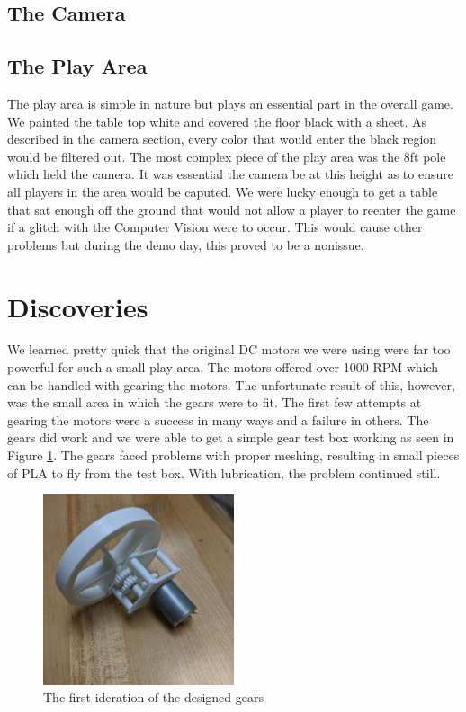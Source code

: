 \documentclass[11pt]{ieeeconf}
\begin{document}
\subsection{The Camera}



\subsection{The Play Area}

The play area is simple in nature but plays an essential part in the overall game. We painted the table top white and covered the floor black with a sheet. As described in the camera section, every color that would enter the black region would be filtered out. The most complex piece of the play area was the 8ft pole which held the camera. It was essential the camera be at this height as to ensure all players in the area would be caputed. We were lucky enough to get a table that sat enough off the ground that would not allow a player to reenter the game if a glitch with the Computer Vision were to occur. This would cause other problems but during the demo day, this proved to be a nonissue. 

\section{Discoveries}

We learned pretty quick that the original DC motors we were using were far too powerful for such a small play area. The motors offered over 1000 RPM which can be handled with gearing the motors. The unfortunate result of this, however, was the small area in which the gears were to fit. The first few attempts at gearing the motors were a success in many ways and a failure in others. The gears did work and we were able to get a simple gear test box working as seen in Figure \ref{gears}. The gears faced problems with proper meshing, resulting in small pieces of PLA to fly from the test box. With lubrication, the problem continued still. 

\begin{figure}[H]
\centering
\captionsetup{justification=centering}
\includegraphics[width=0.5\textwidth]{images/GearTest.jpg}
\caption{The first ideration of the designed gears}
\label{gears}
\end{figure}
\end{document}
